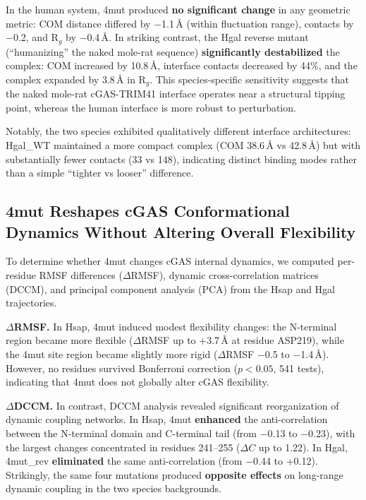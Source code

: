 \documentclass[journal=jcisd8, manuscript=article]{achemso}
\begin{document}
In the human system, 4mut produced \textbf{no significant change} in any geometric metric: COM distance differed by $-$1.1\,\AA{} (within fluctuation range), contacts by $-$0.2, and R$_g$ by $-$0.4\,\AA. In striking contrast, the Hgal reverse mutant (``humanizing'' the naked mole-rat sequence) \textbf{significantly destabilized} the complex: COM increased by 10.8\,\AA, interface contacts decreased by 44\%, and the complex expanded by 3.8\,\AA{} in R$_g$. This species-specific sensitivity suggests that the naked mole-rat cGAS-TRIM41 interface operates near a structural tipping point, whereas the human interface is more robust to perturbation.

Notably, the two species exhibited qualitatively different interface architectures: Hgal\_WT maintained a more compact complex (COM 38.6\,\AA{} vs 42.8\,\AA) but with substantially fewer contacts (33 vs 148), indicating distinct binding modes rather than a simple ``tighter vs looser'' difference.

\subsection{4mut Reshapes cGAS Conformational Dynamics Without Altering Overall Flexibility}

To determine whether 4mut changes cGAS internal dynamics, we computed per-residue RMSF differences ($\Delta$RMSF), dynamic cross-correlation matrices (DCCM), and principal component analysis (PCA) from the Hsap and Hgal trajectories.

\textbf{$\Delta$RMSF.} In Hsap, 4mut induced modest flexibility changes: the N-terminal region became more flexible ($\Delta$RMSF up to +3.7\,\AA{} at residue ASP219), while the 4mut site region became slightly more rigid ($\Delta$RMSF $-$0.5 to $-$1.4\,\AA). However, no residues survived Bonferroni correction ($p < 0.05$, 541 tests), indicating that 4mut does not globally alter cGAS flexibility.

\textbf{$\Delta$DCCM.} In contrast, DCCM analysis revealed significant reorganization of dynamic coupling networks. In Hsap, 4mut \textbf{enhanced} the anti-correlation between the N-terminal domain and C-terminal tail (from $-$0.13 to $-$0.23), with the largest changes concentrated in residues 241--255 ($\Delta C$ up to 1.22). In Hgal, 4mut\_rev \textbf{eliminated} the same anti-correlation (from $-$0.44 to +0.12). Strikingly, the same four mutations produced \textbf{opposite effects} on long-range dynamic coupling in the two species backgrounds.
\end{document}
